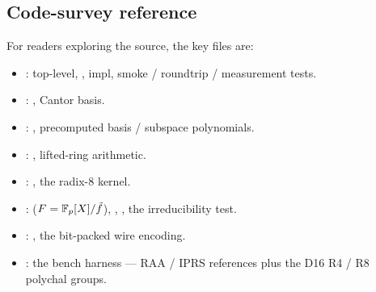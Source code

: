 \subsection{Code-survey reference}

For readers exploring the source, the key files are:

\begin{itemize}\small
  \item {}: top-level,
    ,  impl, smoke /
    roundtrip / measurement tests.
  \item {}:
    , Cantor basis.
  \item {}:
    , precomputed basis / subspace polynomials.
  \item {}:
    , lifted-ring arithmetic.
  \item {}:
    , the radix-8 kernel.
  \item {}:
     ($F = \mathbb{F}_p[X]/\tilde f$), ,
    , the irreducibility test.
  \item {}:
    , the bit-packed wire encoding.
  \item {}: the bench
    harness --- RAA / IPRS references plus the D16 R4 / R8 polychal
    groups.
\end{itemize}
